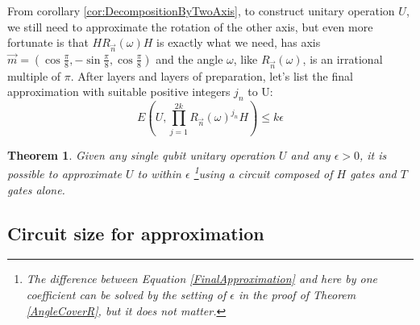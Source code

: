 \documentclass[a4paper,10pt]{book}
\newtheorem{theorem}{Theorem}[section]
\numberwithin{equation}{section}
\begin{document}
From corollary \ref{cor:DecompositionByTwoAxis}, to construct unitary operation $U$, we still need to approximate the rotation of the other axis, but even more fortunate is that $HR_{\vec{n}}(\omega)H$ is exactly what we need, has axis $\vec{m} = (\cos\frac{\pi}{8},-\sin\frac{\pi}{8},\cos\frac{\pi}{8})$ and the angle $\omega$, like $R_{\vec{n}}(\omega)$, is an irrational multiple of $\pi$. After layers and layers of preparation, let's list the final approximation with suitable positive integers $j_{n}$ to U:
\begin{equation}\label{FinalApproximation}
    E(U,\prod_{j=1}^{2k}R_{\vec{n}}(\omega)^{j_{n}}H) \leq k\epsilon
\end{equation}
\begin{theorem}
    Given any single qubit unitary operation $U$ and any $\epsilon > 0$, it is possible to approximate $U$ to within $\epsilon$ \footnote{The difference between Equation \ref{FinalApproximation} and here by one coefficient can be solved by the setting of $\epsilon$ in the proof of Theorem \ref{AngleCoverR}, but it does not matter. }using a circuit composed of $H$ gates and $T$ gates alone.
\end{theorem}



\subsection{Circuit size for approximation}
\end{document}
